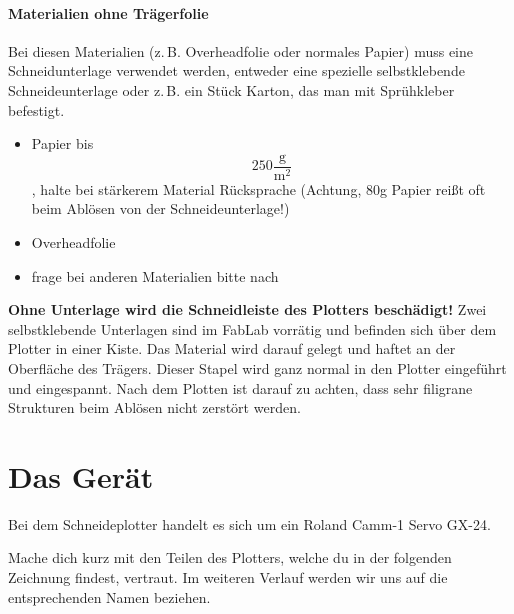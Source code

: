 \documentclass{\basedir/fablab-document}
\begin{document}
\paragraph{Materialien ohne Trägerfolie}


Bei diesen Materialien (z.\,B. Overheadfolie oder normales Papier) muss eine Schneidunterlage verwendet werden,
entweder eine spezielle selbstklebende Schneideunterlage oder z.\,B. ein Stück Karton, das man mit Sprühkleber befestigt.  
\begin{itemize}
 \item Papier bis $$250 \frac{\mathrm{g}}{\mathrm{m}^2}$$, halte bei stärkerem Material Rücksprache (Achtung, 80g Papier reißt oft beim Ablösen von der Schneideunterlage!)
 \item Overheadfolie
 \item frage bei anderen Materialien bitte nach
\end{itemize}

\textbf{Ohne Unterlage wird die Schneidleiste des Plotters beschädigt!}
Zwei selbstklebende Unterlagen sind im FabLab vorrätig und befinden sich über dem Plotter in einer Kiste.
Das Material wird darauf gelegt und haftet an der Oberfläche des Trägers.
Dieser Stapel wird ganz normal in den Plotter eingeführt und eingespannt.
Nach dem Plotten ist darauf zu achten, dass sehr filigrane Strukturen beim Ablösen nicht zerstört werden.


\tableofcontents

\section{Das Gerät}
Bei dem Schneideplotter handelt es sich um ein Roland Camm-1 Servo GX-24. 

Mache dich kurz mit den Teilen des Plotters, welche du in der folgenden Zeichnung findest, vertraut.
Im weiteren Verlauf werden wir uns auf die entsprechenden Namen beziehen.
\end{document}
